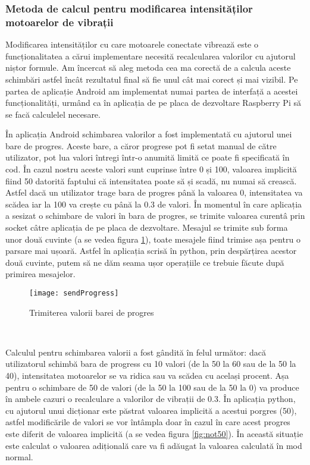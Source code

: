 \documentclass[../IoMusT.tex]{subfiles}
\begin{document}
\subsubsection{Metoda de calcul pentru modificarea intensităților motoarelor de vibrații}
Modificarea intensităților cu care motoarele conectate vibrează este o funcționalitatea a cărui implementare necesită recalcularea valorilor cu ajutorul niștor formule. Am încercat să aleg metoda cea ma corectă de a calcula aceste schimbări astfel încât rezultatul final să fie unul cât mai corect și mai vizibil. Pe partea de aplicație Android am implementat numai partea de interfață a acestei funcționalități, urmând ca în aplicația de pe placa de dezvoltare Raspberry Pi să se facă calculelel necesare.
\\ %
\par În aplicația Android schimbarea valorilor a fost implementată cu ajutorul unei bare de progres. Aceste bare, a căror progrese pot fi setat manual de către utilizator, pot lua valori întregi într-o anumită limită ce poate fi specificată în cod. În cazul nostru aceste valori sunt cuprinse între 0 și 100, valoarea implicită fiind 50 datorită faptului că intensitatea poate să și scadă, nu numai să crească. Astfel dacă un utilizator trage bara de progres până la valoarea 0, intensitatea va scădea iar la 100 va crește cu până la 0.3 de valori. În momentul în care aplicația a sesizat o schimbare de valori în bara de progres, se trimite valoarea curentâ prin socket câtre aplicația de pe placa de dezvoltare. Mesajul se trimite sub forma unor două cuvinte (a se vedea figura \ref{fig:sendProgress}), toate mesajele fiind trimise așa pentru o parsare mai ușoară. Astfel în aplicația scrisă în python, prin despărțirea acestor două cuvinte, putem să ne dăm seama ușor operațiile ce trebuie făcute după primirea mesajelor.
\begin{figure}[h]
\centering
\texttt{[image: sendProgress]}
\caption{Trimiterea valorii barei de progres}
\label{fig:sendProgress}
\end{figure} 
\\
\par Calculul pentru schimbarea valorii a fost gândită în felul următor: dacă utilizatorul schimbă bara de progress cu 10 valori (de la 50 la 60 sau de la 50 la 40), intensitatea motoarelor se va ridica sau va scădea cu același procent. Așa pentru o schimbare de 50 de valori (de la 50 la 100 sau de la 50 la 0) va produce în ambele cazuri o recalculare a valorilor de vibrații de 0.3. În aplicația python, cu ajutorul unui dicționar este păstrat valoarea implicită a acestui porgres (50), astfel modificările de valori se vor întâmpla doar în cazul în care acest progres este diferit de valoarea implicită (a se vedea figura \ref{fig:not50}). În această situație este calculat o valoarea adițională care va fi adăugat la valoarea calculată în mod normal.
\end{document}
